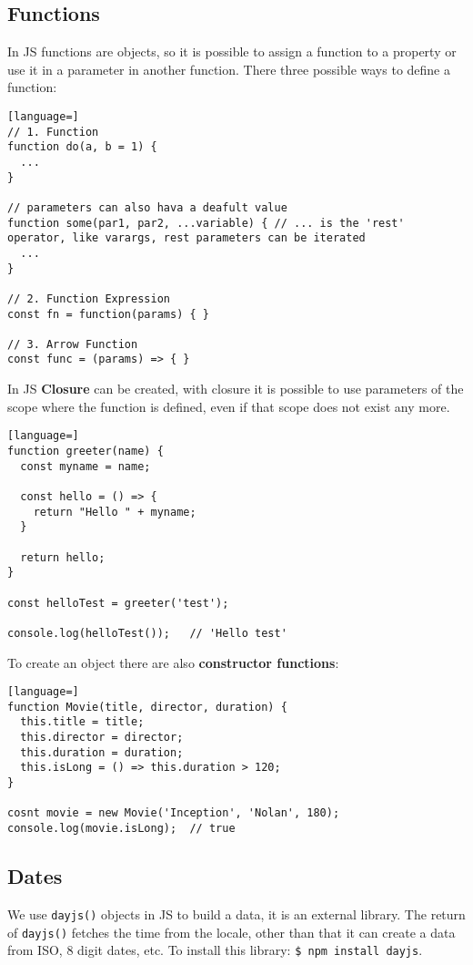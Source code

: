 \documentclass[12pt]{article}
\begin{document}
\subsection{Functions}
In JS functions are objects, so it is possible to assign a function to a property or use it in a parameter in another function. There three possible ways to define a function:
\begin{lstlisting}[language=]
// 1. Function
function do(a, b = 1) {
  ...
}

// parameters can also hava a deafult value
function some(par1, par2, ...variable) { // ... is the 'rest' operator, like varargs, rest parameters can be iterated
  ...
}

// 2. Function Expression
const fn = function(params) { }

// 3. Arrow Function
const func = (params) => { }
\end{lstlisting}
In JS \textbf{Closure} can be created, with closure it is possible to use parameters of the scope where the function is defined, even if that scope does not exist any more.
\begin{lstlisting}[language=]
function greeter(name) {
  const myname = name;

  const hello = () => {
    return "Hello " + myname;
  }

  return hello;
}

const helloTest = greeter('test');

console.log(helloTest());   // 'Hello test'
\end{lstlisting}
To create an object there are also \textbf{constructor functions}:
\begin{lstlisting}[language=]
function Movie(title, director, duration) {
  this.title = title;
  this.director = director;
  this.duration = duration;
  this.isLong = () => this.duration > 120;
}

cosnt movie = new Movie('Inception', 'Nolan', 180);
console.log(movie.isLong);  // true
\end{lstlisting}


\subsection{Dates}
We use \texttt{dayjs()} objects in JS to build a data, it is an external library. The return of \texttt{dayjs()} fetches the time from the locale, other than that it can create a data from ISO, 8 digit dates, etc. To install this library: \texttt{\$ npm install dayjs}.
\end{document}
